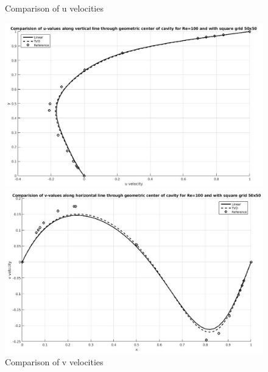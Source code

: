 \documentclass[12pt]{elsarticle}
\begin{document}
	\begin{figure}[h]
		\caption{Comparison of u velocities}
		\centering\includegraphics[width=1.0\linewidth]{5_uvalues_tvd_linear_re_100_50_50}
		\caption{Comparison of v velocities}
		\centering\includegraphics[width=1.0\linewidth]{6_vvalues_tvd_linear_re_100_50_50}
	\end{figure}
	
\end{document}
